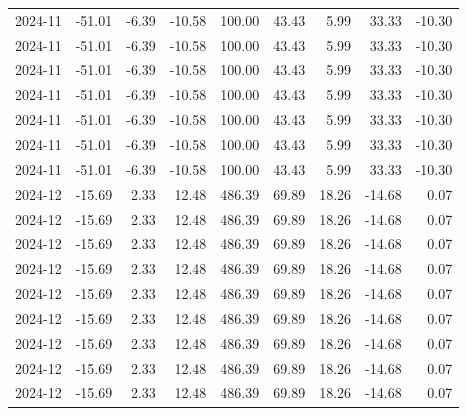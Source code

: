 \begin{table}[ht]
\begin{tabular}{lrrrrrrrr}
  2024-11 & -51.01 & -6.39 & -10.58 & 100.00 & 43.43 & 5.99 & 33.33 & -10.30 \\ 
  2024-11 & -51.01 & -6.39 & -10.58 & 100.00 & 43.43 & 5.99 & 33.33 & -10.30 \\ 
  2024-11 & -51.01 & -6.39 & -10.58 & 100.00 & 43.43 & 5.99 & 33.33 & -10.30 \\ 
  2024-11 & -51.01 & -6.39 & -10.58 & 100.00 & 43.43 & 5.99 & 33.33 & -10.30 \\ 
  2024-11 & -51.01 & -6.39 & -10.58 & 100.00 & 43.43 & 5.99 & 33.33 & -10.30 \\ 
  2024-11 & -51.01 & -6.39 & -10.58 & 100.00 & 43.43 & 5.99 & 33.33 & -10.30 \\ 
  2024-11 & -51.01 & -6.39 & -10.58 & 100.00 & 43.43 & 5.99 & 33.33 & -10.30 \\ 
  2024-12 & -15.69 & 2.33 & 12.48 & 486.39 & 69.89 & 18.26 & -14.68 & 0.07 \\ 
  2024-12 & -15.69 & 2.33 & 12.48 & 486.39 & 69.89 & 18.26 & -14.68 & 0.07 \\ 
  2024-12 & -15.69 & 2.33 & 12.48 & 486.39 & 69.89 & 18.26 & -14.68 & 0.07 \\ 
  2024-12 & -15.69 & 2.33 & 12.48 & 486.39 & 69.89 & 18.26 & -14.68 & 0.07 \\ 
  2024-12 & -15.69 & 2.33 & 12.48 & 486.39 & 69.89 & 18.26 & -14.68 & 0.07 \\ 
  2024-12 & -15.69 & 2.33 & 12.48 & 486.39 & 69.89 & 18.26 & -14.68 & 0.07 \\ 
  2024-12 & -15.69 & 2.33 & 12.48 & 486.39 & 69.89 & 18.26 & -14.68 & 0.07 \\ 
  2024-12 & -15.69 & 2.33 & 12.48 & 486.39 & 69.89 & 18.26 & -14.68 & 0.07 \\ 
  2024-12 & -15.69 & 2.33 & 12.48 & 486.39 & 69.89 & 18.26 & -14.68 & 0.07 \\ 
   \hline
\end{tabular}
\end{table}
